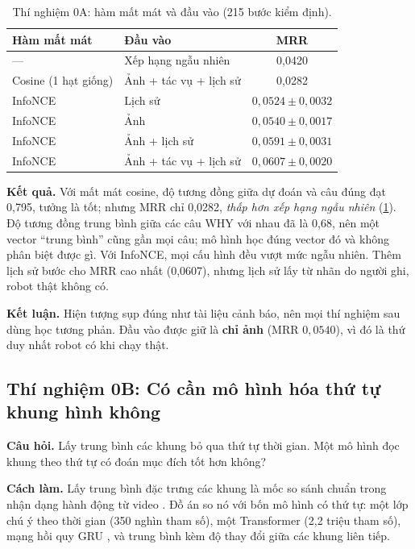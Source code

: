 \documentclass[a4paper,oneside]{report}
\begin{document}
\begin{table}[ht]
\centering
\caption{Thí nghiệm 0A: hàm mất mát và đầu vào (215 bước kiểm định).}
\label{tab:stage0a}
\small
\begin{tabular}{llc}
\toprule
Hàm mất mát & Đầu vào & MRR \\
\midrule
--- & Xếp hạng ngẫu nhiên & 0,0420 \\
Cosine (1 hạt giống) & Ảnh + tác vụ + lịch sử & 0,0282 \\
InfoNCE & Lịch sử & $0{,}0524 \pm 0{,}0032$ \\
InfoNCE & Ảnh & $0{,}0540 \pm 0{,}0017$ \\
InfoNCE & Ảnh + lịch sử & $0{,}0591 \pm 0{,}0031$ \\
InfoNCE & Ảnh + tác vụ + lịch sử & $0{,}0607 \pm 0{,}0020$ \\
\bottomrule
\end{tabular}
\end{table}

\textbf{Kết quả.} Với mất mát cosine, độ tương đồng giữa dự đoán và câu đúng đạt 0,795, tưởng là tốt; nhưng MRR chỉ 0,0282, \textit{thấp hơn xếp hạng ngẫu nhiên} (\cref{tab:stage0a}). Độ tương đồng trung bình giữa các câu WHY với nhau đã là 0,68, nên một vector ``trung bình'' cũng gần mọi câu; mô hình học đúng vector đó và không phân biệt được gì. Với InfoNCE, mọi cấu hình đều vượt mức ngẫu nhiên. Thêm lịch sử bước cho MRR cao nhất (0,0607), nhưng lịch sử lấy từ nhãn do người ghi, robot thật không có.

\textbf{Kết luận.} Hiện tượng sụp đúng như tài liệu cảnh báo, nên mọi thí nghiệm sau dùng học tương phản. Đầu vào được giữ là \textbf{chỉ ảnh} (MRR $0{,}0540$), vì đó là thứ duy nhất robot có khi chạy thật.

\subsection{Thí nghiệm 0B: Có cần mô hình hóa thứ tự khung hình không}

\textbf{Câu hỏi.} Lấy trung bình các khung bỏ qua thứ tự thời gian. Một mô hình đọc khung theo thứ tự có đoán mục đích tốt hơn không?

\textbf{Cách làm.} Lấy trung bình đặc trưng các khung là mốc so sánh chuẩn trong nhận dạng hành động từ video \citep{wang2016tsn}. Đồ án so nó với bốn mô hình có thứ tự: một lớp chú ý theo thời gian (350 nghìn tham số), một Transformer \citep{vaswani2017attention} (2,2 triệu tham số), mạng hồi quy GRU \citep{cho2014gru}, và trung bình kèm độ thay đổi giữa các khung liên tiếp.
\end{document}
